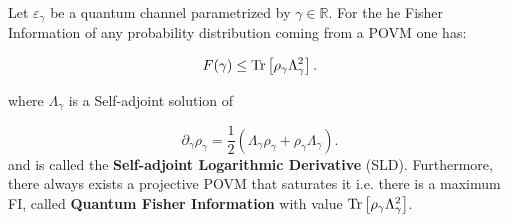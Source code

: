 \begin{theorem}\label{theorem:QFI}
  Let $\varepsilon_{\gamma}$ be a quantum channel parametrized by $\gamma \in \mathds{R}$. For the he Fisher Information of any probability distribution coming from a POVM one has:

  \begin{equation}
F(\gamma) \leq  \mathrm{Tr}\left[\rho_{\gamma}\Lambda_{\gamma}^{2}\right].
\end{equation}

where $\Lambda_{\gamma}$ is a Self-adjoint solution of

\begin{equation}\label{eq:SLD_definition}
  \partial_{\gamma}\rho_{\gamma} = \frac{1}{2}\left(\Lambda_{\gamma}\rho_{\gamma} + \rho_{\gamma}\Lambda_{\gamma} \right).
\end{equation}
and is called the  \textbf{Self-adjoint Logarithmic Derivative} (SLD). Furthermore, there always exists a projective POVM that saturates it \cite{paris_quantum_2009} i.e. there is a maximum FI, called \textbf{Quantum Fisher Information} with value $\mathrm{Tr}\left[\rho_{\gamma}\Lambda_{\gamma}^{2}\right]$.
\end{theorem}

